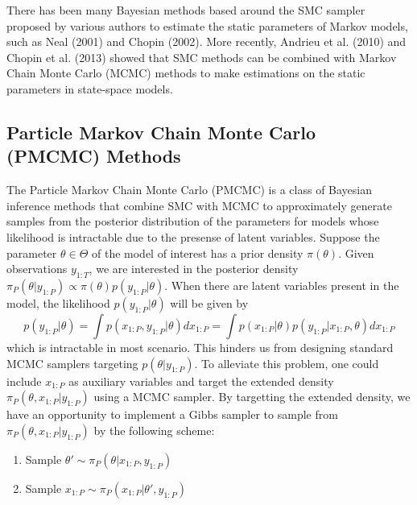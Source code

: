 \documentclass[12pt,a4paper]{article}
\begin{document}
There has been many Bayesian methods based around the SMC sampler proposed by various authors to estimate the static parameters of Markov models, such as Neal (2001) and Chopin (2002). More recently, Andrieu et al. (2010) and Chopin et al. (2013) showed that SMC methods can be combined with Markov Chain Monte Carlo (MCMC) methods to make estimations on the static parameters in state-space models. 
\subsection{Particle Markov Chain Monte Carlo (PMCMC) Methods }
The Particle Markov Chain Monte Carlo (PMCMC) is a class of Bayesian inference methods that combine SMC with MCMC to approximately generate samples from the posterior distribution of the parameters for models whose likelihood is intractable due to the presense of latent variables. Suppose the parameter $\theta \in \Theta$ of the model of interest has a prior density $\pi(\theta)$. Given observations $y_{1:T}$, we are interested in the posterior density $\pi_P(\theta|y_{1:P}) \propto \pi(\theta)p(y_{1:P}|\theta)$. When there are latent variables present in the model, the likelihood $p(y_{1:P}|\theta)$ will be given by 
\begin{equation}
    \label{PMCMC-marginal likelihood}
    p(y_{1:P}|\theta) = \int p(x_{1:P},y_{1:P}|\theta)dx_{1:P} = \int p(x_{1:P}|\theta) p(y_{1:P}|x_{1:P},\theta) dx_{1:P}
\end{equation}
which is intractable in most scenario. This hinders us from designing standard MCMC samplers targeting $p(\theta|y_{1:P})$. To alleviate this problem, one could include $x_{1:P}$ as auxiliary variables and target the extended density $\pi_P(\theta,x_{1:P}|y_{1:P})$ using a MCMC sampler. By targetting the extended density, we have an opportunity to implement a Gibbs sampler to sample from $\pi_P(\theta,x_{1:P}|y_{1:P})$ by the following scheme:
\begin{enumerate}[label=\textit{Step \arabic*.},leftmargin=*]
    \item Sample $\theta' \sim \pi_P(\theta|x_{1:P},y_{1:P})$
    \item Sample $x_{1:P} \sim \pi_P(x_{1:P}|\theta',y_{1:P})$
\end{enumerate}
\end{document}
